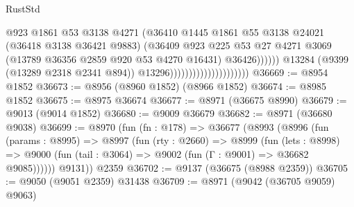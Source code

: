 \begin{lexlean}{RustStd}
\begin{coremodule}
                                                      @923
                                                      @1861
                                                      @53
                                                      @3138
                                                      @4271
                                                      (@36410
                                                        @1445
                                                        @1861
                                                        @55
                                                        @3138
                                                        @24021
                                                        (@36418 @3138 @36421 @9883)
                                                        (@36409
                                                          @923
                                                          @225
                                                          @53
                                                          @27
                                                          @4271
                                                          @3069
                                                          (@13789
                                                            @36356
                                                            @2859
                                                            @920
                                                            @53
                                                            @4270
                                                            @16431)
                                                          @36426))))))
                                              @13284
                                              (@9399 (@13289 @2318 @2341 @894))
                                              @13296)))))))))))))))))))))
@36669 := @8954 @1852
@36673 := @8956 (@8960 @1852) (@8966 @1852)
@36674 := @8985 @1852
@36675 := @8975 @36674
@36677 := @8971 (@36675 @8990)
@36679 := @9013 (@9014 @1852)
@36680 := @9009 @36679
@36682 := @8971 (@36680 @9038)
@36699 := @8970
    (fun (fn : @178) =>
    @36677
      (@8993
        (@8996
          (fun (params : @8995) =>
          @8997
            (fun (rty : @2660) =>
            @8999
              (fun (lets : @8998) =>
              @9000 (fun (tail : @3064) => @9002 (fun (Γ : @9001) => @36682 @9085))))))
        @9131))
    @2359
@36702 := @9137 (@36675 (@8988 @2359))
@36705 := @9050 (@9051 @2359) @31438
@36709 := @8971 (@9042 (@36705 @9059) @9063)

\end{coremodule}
\end{lexlean}
